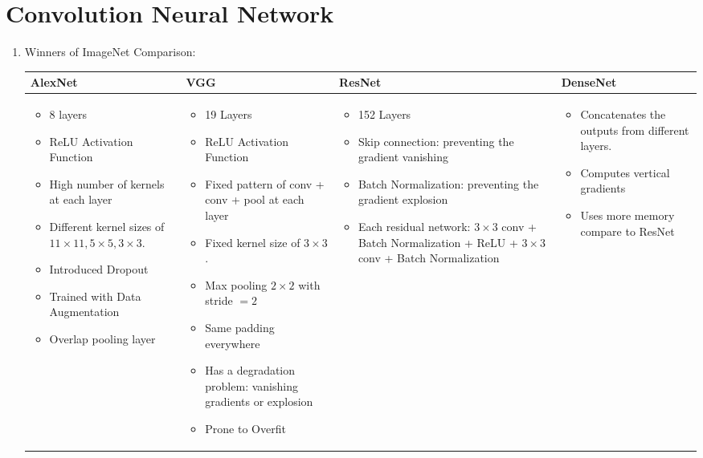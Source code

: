 \documentclass[12pt]{article}
\begin{document}
\section*{Convolution Neural Network}
\begin{enumerate}
    \item Winners of ImageNet Comparison:
    \begin{table}[h!]
    \centering
    \scriptsize
    \begin{tabular}{>{\raggedright}p{4cm}| >{\raggedright}p{4cm}| >{\raggedright}p{4cm}| >{\raggedright\arraybackslash}p{4cm}}
    \toprule
    \textbf{AlexNet} & \textbf{VGG} & \textbf{ResNet} & \textbf{DenseNet} \\
    \midrule
    \begin{itemize}
        \item 8 layers
        \item ReLU Activation Function
        \item High number of kernels at each layer
        \item Different kernel sizes of $11 \times 11, 5 \times 5, 3 \times 3$.
        \item Introduced Dropout
        \item Trained with Data Augmentation
        \item Overlap pooling layer
    \end{itemize}
    &
    \begin{itemize}
        \item 19 Layers
        \item ReLU Activation Function
        \item Fixed pattern of conv + conv + pool at each layer
        \item Fixed kernel size of $3 \times 3$.
        \item Max pooling $2 \times 2$ with stride $=2$
        \item Same padding everywhere
        \item Has a degradation problem: vanishing gradients or explosion
        \item Prone to Overfit
    \end{itemize}
    &
    \begin{itemize}
        \item 152 Layers
        \item Skip connection: preventing the gradient vanishing 
        \item Batch Normalization: preventing the gradient explosion 
        \item Each residual network: $3 \times 3$ conv + Batch Normalization + ReLU + $3 \times 3$ conv + Batch Normalization
    \end{itemize}
    &
    \begin{itemize}
        \item Concatenates the outputs from different layers.
        \item Computes vertical gradients
        \item Uses more memory compare to ResNet
    \end{itemize}
    \\
    

\end{tabular}
\end{table}
\end{enumerate}
\end{document}
